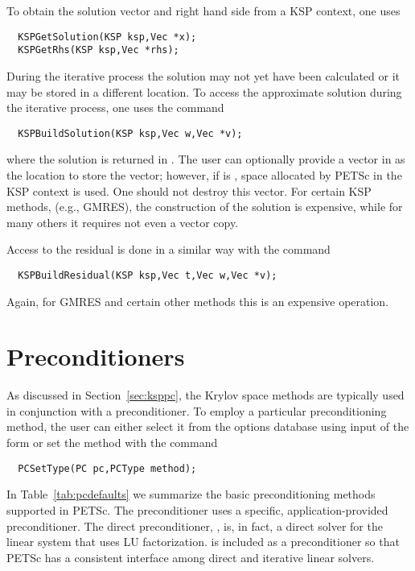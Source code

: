 To obtain the solution vector and right hand side from a KSP 
context, one uses  
\begin{verbatim}
  KSPGetSolution(KSP ksp,Vec *x);
  KSPGetRhs(KSP ksp,Vec *rhs);
\end{verbatim}
During   the iterative process
the solution may not yet have been calculated or it may be stored in 
a different location. To access the approximate solution during the 
iterative process, one uses the command 
\begin{verbatim}
  KSPBuildSolution(KSP ksp,Vec w,Vec *v);
\end{verbatim}
where the solution is returned in . The user can optionally provide
a vector in  as the location to store the vector; however, if 
 is , space allocated by PETSc in the KSP context is 
used. One should not destroy this vector. For certain KSP methods, 
(e.g., GMRES), the construction of the solution is expensive, while for many 
others it requires not even a vector copy. 

Access to the residual is done in a similar way with the 
command 
\begin{verbatim}
  KSPBuildResidual(KSP ksp,Vec t,Vec w,Vec *v);
\end{verbatim}
Again, for GMRES and certain other methods this is an expensive 
operation.

\section{Preconditioners} 
\label{sec:pc}

As discussed in Section~\ref{sec:ksppc}, the Krylov space methods are
typically used in conjunction with a preconditioner.
To employ a particular preconditioning method, the user can either select 
it from the options database using input of the form 
 or set the method with the 
command  
\begin{verbatim}
  PCSetType(PC pc,PCType method);
\end{verbatim}
In Table~\ref{tab:pcdefaults} we summarize the basic
preconditioning methods supported in PETSc. 
   
  
The  preconditioner uses a specific,
application-provided preconditioner.  The direct preconditioner, ,
is, in fact, a direct solver for the linear system that uses LU
factorization.  is included as a preconditioner so that PETSc has a
consistent interface among direct and iterative linear solvers.

